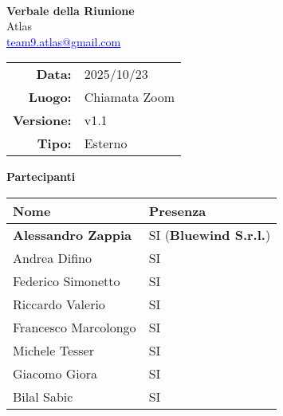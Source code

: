 \documentclass[a4paper,12pt]{article}
\makeatletter
\newcommand{\Gruppo}{Atlas}
\newcommand{\Email}{\href{mailto:team9.atlas@gmail.com}{\textcolor{blue}{\underline{team9.atlas@gmail.com}}}}
\newcommand{\TitoloVerbale}{Verbale della Riunione}
\newcommand{\DataVerbale}{2025/10/23}
\newcommand{\LuogoVerbale}{Chiamata Zoom}
\newcommand{\LogoGruppo}{img/AtlasLogo.png}
\newcommand{\VersioneVerbale}{v1.1} %
\newcommand{\VerbaleEsterno}{Esterno}
\makeatother
\begin{document}
\begin{titlepage}
    \centering

    \vspace*{0cm}
    \\
    [.5cm]
    {\Huge \textbf{\TitoloVerbale}}\\[0.8cm]
    {\LARGE \Gruppo}\\[0.1cm]
    {\Email}\\[1.2cm]

    \begin{tabular}{rl}
        \textbf{Data:} & \DataVerbale \\
        \textbf{Luogo:} & \LuogoVerbale \\
        \textbf{Versione:} & \VersioneVerbale \\
        \textbf{Tipo:} & \VerbaleEsterno \\
    \end{tabular}

    \vspace{1.2cm}

    {\large \textbf{Partecipanti}}\\[0.5cm]
    \begin{tabular}{l|l}
        \textbf{Nome} & \textbf{Presenza} \\
        \hline
        \textbf{Alessandro Zappia} & SI (\textbf{Bluewind S.r.l.})\\
        Andrea Difino & SI \\
        Federico Simonetto & SI \\
        Riccardo Valerio & SI \\
        Francesco Marcolongo & SI \\
        Michele Tesser & SI \\
        Giacomo Giora & SI \\
        Bilal Sabic & SI \\
    \end{tabular}

\end{titlepage}
\end{document}
